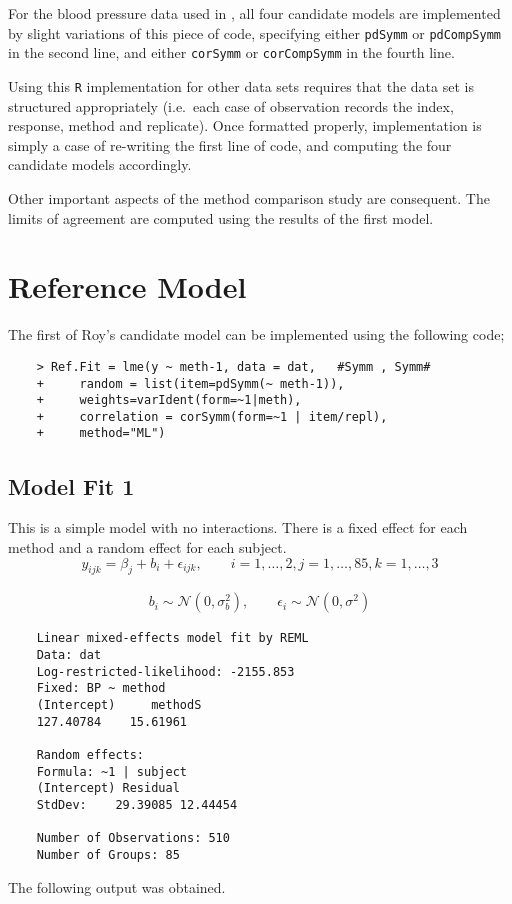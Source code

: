 \documentclass[12pt, a4paper]{report}
\theoremstyle{plain}
\theoremstyle{definition}
\theoremstyle{remark}
\begin{document}
For the blood pressure data used in \citet{ARoy2009}, all four candidate models are implemented by slight variations of this piece of code, specifying either \texttt{pdSymm} or \texttt{pdCompSymm} in the second line, and either \texttt{corSymm} or \texttt{corCompSymm} in the fourth line.



Using this \texttt{R} implementation for other data sets requires that the data set is structured appropriately (i.e.\ each case of observation records the index, response, method and replicate). Once formatted properly, implementation is simply a case of re-writing the first line of code, and computing the four candidate models accordingly.


Other important aspects of the method comparison study are consequent. The limits of agreement are computed using the results of the first model.

\section{Reference Model}
The first of Roy's candidate model can be implemented using the following code;
\begin{framed}
	\begin{verbatim}
	> Ref.Fit = lme(y ~ meth-1, data = dat,   #Symm , Symm#
	+     random = list(item=pdSymm(~ meth-1)), 
	+     weights=varIdent(form=~1|meth),
	+     correlation = corSymm(form=~1 | item/repl), 
	+     method="ML")
	\end{verbatim}
\end{framed}

\subsection{Model Fit 1}

This is a simple model with no interactions. There is a fixed effect for each method and a random effect for each subject.
\begin{equation*}
y_{ijk} = \beta_{j}  + b_{i} + \epsilon_{ijk}, \qquad i=1,\dots,2, j=1,\dots,85, k=1,\dots,3
\end{equation*}

\begin{eqnarray*}
	b_{i} \sim \mathcal{N}(0,\sigma^2_{b}), \qquad \epsilon_{i} \sim \mathcal{N}(0,\sigma^2)
\end{eqnarray*}


\begin{framed}
	\begin{verbatim}
	Linear mixed-effects model fit by REML
	Data: dat
	Log-restricted-likelihood: -2155.853
	Fixed: BP ~ method
	(Intercept)     methodS
	127.40784    15.61961
	
	Random effects:
	Formula: ~1 | subject
	(Intercept) Residual
	StdDev:    29.39085 12.44454
	
	Number of Observations: 510
	Number of Groups: 85
	\end{verbatim}
\end{framed}
The following output was obtained.
\end{document}
